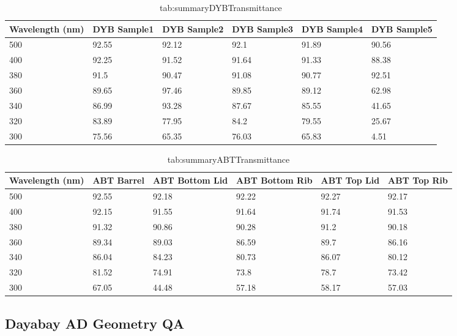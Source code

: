 \begin{table}
\centering
\caption{tab:summaryDYBTransmittance}
\label{tab:}
\begin{tabular}{lp{1.5cm}p{1.5cm}p{1.5cm}p{1.5cm}p{1.5cm}}
\hline
Wavelength (nm) & DYB Sample1 & DYB Sample2 & DYB Sample3 & DYB Sample4 & DYB Sample5 \\
\hline
\hline
500 & 92.55 &  92.12 &  92.1  &  91.89 &  90.56 \\
400 & 92.25 &  91.52 &  91.64 &  91.33 &  88.38 \\
380 & 91.5  &  90.47 &  91.08 &  90.77 &  92.51 \\
360 & 89.65 &  97.46 &  89.85 &  89.12 &  62.98 \\
340 & 86.99 &  93.28 &  87.67 &  85.55 &  41.65 \\
320 & 83.89 &  77.95 &  84.2  &  79.55 &  25.67 \\
300 & 75.56 &  65.35 &  76.03 &  65.83 &  4.51  \\
\hline
\end{tabular}
\end{table}



\begin{table}
\centering
\caption{tab:summaryABTTransmittance}
\label{tab:}
\begin{tabular}{lp{1.5cm}p{1.5cm}p{1.5cm}p{1.5cm}p{1.5cm}}
\hline
Wavelength (nm) & ABT Barrel  & ABT Bottom Lid & ABT Bottom Rib &  ABT Top Lid &  ABT Top Rib \\
\hline
\hline
500 & 92.55 &  92.18 &  92.22 &  92.27 &  92.17\\
400 & 92.15 &  91.55 &  91.64 &  91.74 &  91.53\\
380 & 91.32 &  90.86 &  90.28 &  91.2  &  90.18\\
360 & 89.34 &  89.03 &  86.59 &  89.7  &  86.16\\
340 & 86.04 &  84.23 &  80.73 &  86.07 &  80.12\\
320 & 81.52 &  74.91 &  73.8  &  78.7  &  73.42\\
300 & 67.05 &  44.48 &  57.18 &  58.17 &  57.03\\
\end{tabular}
\end{table}


\subsection {Dayabay AD Geometry QA}


